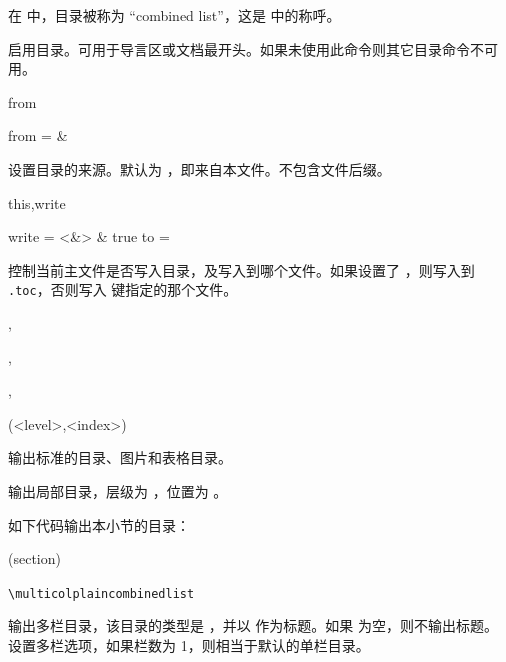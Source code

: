\documentclass[twoside]{book}
\def\xampletext{\par}
\def\xampleprint{\xamplecode \xampleline \xampletext}
\begin{document}
在 \CusTeX 中，目录被称为 “combined list”，这是 \ConTeXt 中的称呼。

\begin{function}{\enablecombinedlist}
 启用目录。可用于导言区或文档最开头。如果未使用此命令则其它目录命令不可用。
\end{function}

\begin{keyval}[path=cbl-setup]{from}
  \begin{syntax}
    from =  & \V\jobname
  \end{syntax}
设置目录的来源。默认为 ，即来自本文件。不包含文件后缀。
\end{keyval}

\begin{keyval}[path=cbl-setup]{this,write}
  \begin{syntax}
    write = <&\TTF> & true 
    to    = 
  \end{syntax}
控制当前主文件是否写入目录，及写入到哪个文件。如果设置了 ，则写入到 \texttt{.toc}，否则写入  键指定的那个文件。
\end{keyval}

\begin{function}{\tableofcontents,\listoffigures,\listoftables,\localtableofcontents}
\begin{syntax}
  \V\tableofcontents      {}
  \V\localtableofcontents {} \string(<level>,<index>\string)
\end{syntax}
输出标准的目录、图片和表格目录。

 输出局部目录，层级为 ，位置为 。
\end{function}

如下代码输出本小节的目录：
\begin{xample}
\renewcommand\contentsname{}
\localtableofcontents(section)
\stopxamplecode
\xampleprint
\end{xample}

\begin{function}{\multicolplaincombinedlist}
  \begin{syntax}
    \verb|\multicolplaincombinedlist|   
  \end{syntax}
 输出多栏目录，该目录的类型是 ，并以  作为标题。如果  为空，则不输出标题。 设置多栏选项，如果栏数为 1，则相当于默认的单栏目录。
\end{function}
\end{document}
